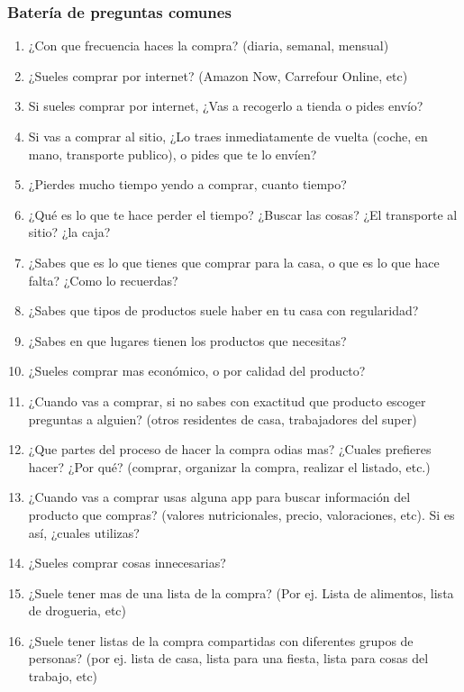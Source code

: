 \subsubsection{Batería de preguntas comunes}

\begin{enumerate}
    \item ¿Con que frecuencia haces la compra? (diaria, semanal, mensual)
    \item ¿Sueles comprar por internet? (Amazon Now, Carrefour Online, etc)
    \item Si sueles comprar por internet, ¿Vas a recogerlo a tienda o pides envío?
    \item Si vas a comprar al sitio, ¿Lo traes inmediatamente de vuelta (coche, en mano, transporte publico), o pides que te lo envíen?
    \item ¿Pierdes mucho tiempo yendo a comprar, cuanto tiempo?
    \item ¿Qué es lo que te hace perder el tiempo? ¿Buscar las cosas? ¿El transporte al sitio? ¿la caja?
    \item ¿Sabes que es lo que tienes que comprar para la casa, o que es lo que hace falta? ¿Como lo recuerdas?
    \item ¿Sabes que tipos de productos suele haber en tu casa con regularidad?
    \item ¿Sabes en que lugares tienen los productos que necesitas?
    \item ¿Sueles comprar mas económico, o por calidad del producto?
    \item ¿Cuando vas a comprar, si no sabes con exactitud que producto escoger preguntas a alguien? (otros residentes de casa, trabajadores del super)
    \item ¿Que partes del proceso de hacer la compra odias mas? ¿Cuales prefieres hacer? ¿Por qué? (comprar, organizar la compra, realizar el listado, etc.)
    \item ¿Cuando vas a comprar usas alguna app para buscar información del producto que compras? (valores nutricionales, precio, valoraciones, etc). Si es así, ¿cuales utilizas?
    \item ¿Sueles comprar cosas innecesarias?
    \item ¿Suele tener mas de una lista de la compra? (Por ej. Lista de alimentos, lista de drogueria, etc) 
    \item ¿Suele tener listas de la compra compartidas con diferentes grupos de personas? (por ej. lista de casa, lista para una fiesta, lista para cosas del trabajo, etc)
\end{enumerate}

